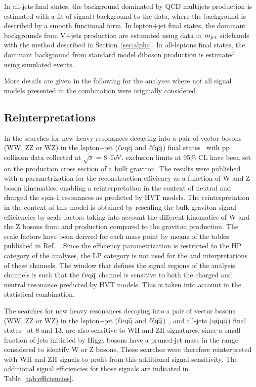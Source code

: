 In all-jets final states, the background dominated by QCD multijets production is estimated with a fit of signal+background to the data, where the background is described by a smooth functional form.
In lepton+jet final states, the dominant backgrounds from V+jets production are estimated using data in $m_{\text{jet}}$ sidebands with the method described in Section~\ref{sec:alpha}.
In all-leptons final states, the dominant background from standard model diboson production is estimated using simulated events.

More details are given in the following for the analyses where not all signal models presented in the combination were originally considered.

\subsection{Reinterpretations}

In the searches for new heavy resonances decaying into a pair of vector bosons (WW, ZZ or WZ) in the lepton+jet ($\ell \nu \mathrm{q}\overline{\mathrm{q}}$ and $\ell\ell \mathrm{q}\overline{\mathrm{q}}$) final states~\cite{Khachatryan:2014gha} with pp collision data collected at $\sqrt{s}$ = 8 TeV, exclusion limits at 95\% CL have been set on the production cross section of a bulk graviton.
The results were published with a parametrization for the reconstruction efficiency as a function of W and Z boson kinematics, enabling a reinterpretation in the context of neutral and charged the spin-1 resonances as predicted by HVT models.
The reinterpretation in the context of this model is obtained by rescaling the bulk graviton signal efficiencies by scale factors taking into account the different kinematics of W and the Z bosons from \PWpr{} and \cPZpr{} production compared to the graviton production.
The scale factors have been derived for each mass point by means of the tables published in Ref.~\cite{Khachatryan:2014gha}.
Since the efficiency parametrization is restricted to the HP category of the analyses, the LP category is not used for the \PWpr{} and \cPZpr{} interpretations of these channels.
The \mJ window that defines the signal regions of the analysis channels is such that the $\ell \nu \mathrm{q}\overline{\mathrm{q}}$ channel is sensitive to both the charged and neutral resonance predicted by HVT models. This is taken into account in the statistical combination.

The searches for new heavy resonances decaying into a pair of vector bosons (WW, ZZ or WZ) in the lepton+jet ($\ell \nu \mathrm{q}\overline{\mathrm{q}}$ and $\ell\ell \mathrm{q}\overline{\mathrm{q}}$)~\cite{Khachatryan:2014gha,Khachatryan:2014gha,CMS-PAS-EXO-15-002}, and all-jets ($\mathrm{q}\overline{\mathrm{q}} \mathrm{q}\overline{\mathrm{q}}$) final states~\cite{Khachatryan:2014hpa,CMS-PAS-EXO-15-002} at 8 and 13\TeV, are also sensitive to WH and ZH signatures, since a small fraction of jets initiated by Higgs bosons have a pruned-jet mass in the range considered to identify W or Z bosons.
These searches were therefore reinterpreted with WH and ZH signals to profit from this additional signal sensitivity.
The additional signal efficiencies for those signals are indicated in Table~\ref{tab:efficiencies}.

